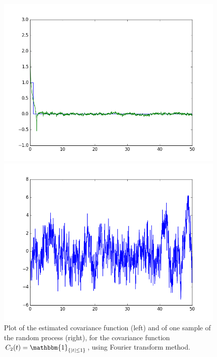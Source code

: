 \documentclass[a4paper,11pt]{article}
\theoremstyle{definition}
\theoremstyle{plain}
\theoremstyle{remark}
\DeclarePairedDelimiter{\abs}{\lvert}{\rvert}
\DeclarePairedDelimiter{\bra}{\lbrace}{\rbrace}
\begin{document}
\begin{figure}[htbp]
\centering
\begin{minipage}[c]{.47\textwidth}
\includegraphics[width=\textwidth,
keepaspectratio]{ex6_C2_dft_cov.png}
\end{minipage}
\hspace{4mm}
\begin{minipage}[c]{.47\textwidth}
\includegraphics[width=\textwidth,
keepaspectratio]{ex6_C2_dft_sample.png}
\end{minipage}
\caption{ \label{figure:ex6_C2_dft} Plot of the estimated covariance function (left) and of one sample of the random process (right), for the covariance function $C_2(t) = \mathbbm{1}_{\bra{\abs{t}\leq1}}$, using Fourier transform method.}
\end{figure}
\end{document}
